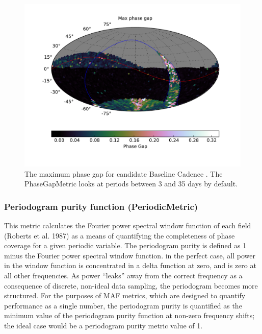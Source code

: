 \begin{figure}[tbh!]
\includegraphics{figs/variables/enigma_1189_Phase_Gap_LargestGap_OPSI_SkyMap.pdf}
\caption{The maximum phase gap for candidate Baseline Cadence .
The PhaseGapMetric looks at periods between 3 and 35 days by default.}
\label{fig:enigmaMaxGap}
\end{figure}

\subsubsection{Periodogram purity function (PeriodicMetric)}
This metric calculates the Fourier power spectral window function of each field (Roberts et al. 1987) as a means of quantifying the completeness of phase coverage for a given periodic variable. The periodogram purity is defined as 1 minus the Fourier power spectral window function. in the perfect case, all power in the window function is concentrated in a delta function at zero, and is zero at all other frequencies. As power ``leaks'' away from the correct frequency as a consequence of discrete, non-ideal data sampling, the periodogram becomes more structured. For the purposes of MAF metrics, which are designed to quantify performance as a single number, the periodogram purity is quantified as the minimum value of the periodogram purity function at non-zero frequency shifts; the ideal case would be a periodogram purity metric value of 1.

